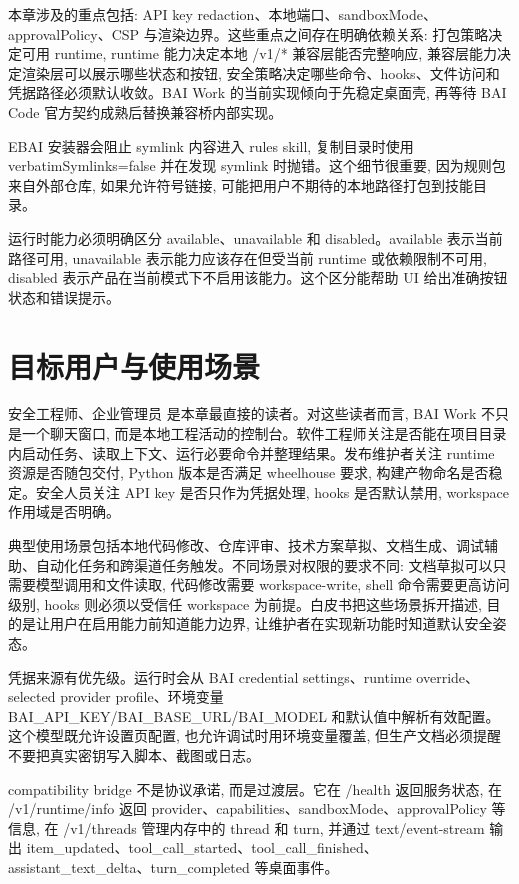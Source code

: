 本章涉及的重点包括: API key redaction、本地端口、sandboxMode、approvalPolicy、CSP 与渲染边界。这些重点之间存在明确依赖关系: 打包策略决定可用 runtime, runtime 能力决定本地 /v1/* 兼容层能否完整响应, 兼容层能力决定渲染层可以展示哪些状态和按钮, 安全策略决定哪些命令、hooks、文件访问和凭据路径必须默认收敛。BAI Work 的当前实现倾向于先稳定桌面壳, 再等待 BAI Code 官方契约成熟后替换兼容桥内部实现。

EBAI 安装器会阻止 symlink 内容进入 rules skill, 复制目录时使用 verbatimSymlinks=false 并在发现 symlink 时抛错。这个细节很重要, 因为规则包来自外部仓库, 如果允许符号链接, 可能把用户不期待的本地路径打包到技能目录。

运行时能力必须明确区分 available、unavailable 和 disabled。available 表示当前路径可用, unavailable 表示能力应该存在但受当前 runtime 或依赖限制不可用, disabled 表示产品在当前模式下不启用该能力。这个区分能帮助 UI 给出准确按钮状态和错误提示。

\section{目标用户与使用场景}
安全工程师、企业管理员 是本章最直接的读者。对这些读者而言, BAI Work 不只是一个聊天窗口, 而是本地工程活动的控制台。软件工程师关注是否能在项目目录内启动任务、读取上下文、运行必要命令并整理结果。发布维护者关注 runtime 资源是否随包交付, Python 版本是否满足 wheelhouse 要求, 构建产物命名是否稳定。安全人员关注 API key 是否只作为凭据处理, hooks 是否默认禁用, workspace 作用域是否明确。

典型使用场景包括本地代码修改、仓库评审、技术方案草拟、文档生成、调试辅助、自动化任务和跨渠道任务触发。不同场景对权限的要求不同: 文档草拟可以只需要模型调用和文件读取, 代码修改需要 workspace-write, shell 命令需要更高访问级别, hooks 则必须以受信任 workspace 为前提。白皮书把这些场景拆开描述, 目的是让用户在启用能力前知道能力边界, 让维护者在实现新功能时知道默认安全姿态。

凭据来源有优先级。运行时会从 BAI credential settings、runtime override、selected provider profile、环境变量 BAI\_API\_KEY/BAI\_BASE\_URL/BAI\_MODEL 和默认值中解析有效配置。这个模型既允许设置页配置, 也允许调试时用环境变量覆盖, 但生产文档必须提醒不要把真实密钥写入脚本、截图或日志。

compatibility bridge 不是协议承诺, 而是过渡层。它在 /health 返回服务状态, 在 /v1/runtime/info 返回 provider、capabilities、sandboxMode、approvalPolicy 等信息, 在 /v1/threads 管理内存中的 thread 和 turn, 并通过 text/event-stream 输出 item\_updated、tool\_call\_started、tool\_call\_finished、assistant\_text\_delta、turn\_completed 等桌面事件。

